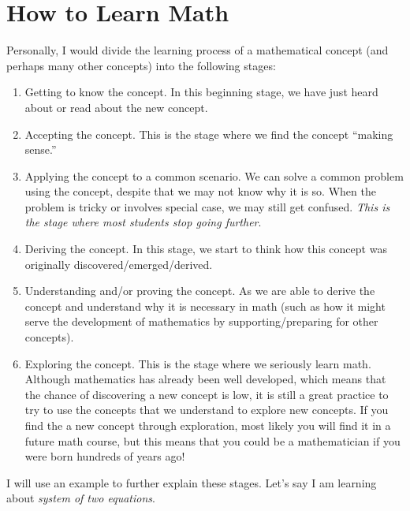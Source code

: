 \documentclass[
]{book}
\providecommand{\tightlist}{%
  \setlength{\itemsep}{0pt}\setlength{\parskip}{0pt}}
\theoremstyle{definition}
\theoremstyle{definition}
\theoremstyle{definition}
\theoremstyle{definition}
\theoremstyle{remark}
\begin{document}
\hypertarget{how-to-learn-math}{%
\section*{How to Learn Math}\label{how-to-learn-math}}

Personally, I would divide the learning process of a mathematical concept (and perhaps many other concepts) into the following stages:

\begin{enumerate}
\def\labelenumi{\arabic{enumi}.}
\tightlist
\item
  Getting to know the concept. In this beginning stage, we have just heard about or read about the new concept.
\item
  Accepting the concept. This is the stage where we find the concept ``making sense.''
\item
  Applying the concept to a common scenario. We can solve a common problem using the concept, despite that we may not know why it is so. When the problem is tricky or involves special case, we may still get confused. \emph{This is the stage where most students stop going further}.
\item
  Deriving the concept. In this stage, we start to think how this concept was originally discovered/emerged/derived.
\item
  Understanding and/or proving the concept. As we are able to derive the concept and understand why it is necessary in math (such as how it might serve the development of mathematics by supporting/preparing for other concepts).
\item
  Exploring the concept. This is the stage where we seriously learn math. Although mathematics has already been well developed, which means that the chance of discovering a new concept is low, it is still a great practice to try to use the concepts that we understand to explore new concepts. If you find the a new concept through exploration, most likely you will find it in a future math course, but this means that you could be a mathematician if you were born hundreds of years ago!
\end{enumerate}

I will use an example to further explain these stages. Let's say I am learning about \emph{system of two equations}.
\end{document}
